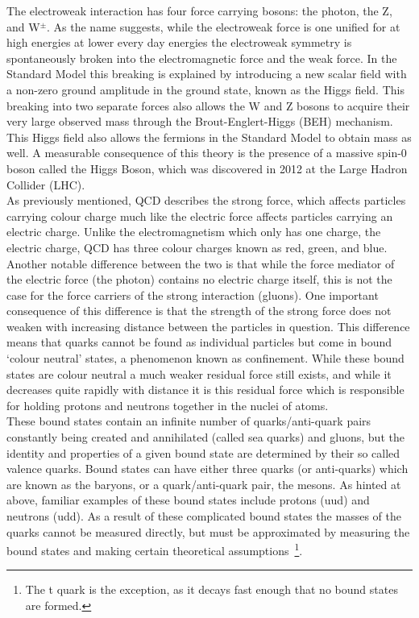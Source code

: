 The electroweak interaction has four force carrying bosons: the photon, the Z, and W$^{\pm}$.  
As the name suggests, while the electroweak force is one unified for at high energies at lower every day energies the electroweak symmetry is spontaneously broken into the electromagnetic force and the weak force.  
In the Standard Model this breaking is explained by introducing a new scalar field with a non-zero ground amplitude in the ground state, known as the Higgs field.  
This breaking into two separate forces also allows the W and Z bosons to acquire their very large observed mass through the Brout-Englert-Higgs (BEH) mechanism.  
This Higgs field also allows the fermions in the Standard Model to obtain mass as well.  
A measurable consequence of this theory is the presence of a massive spin-0 boson called the Higgs Boson, which was discovered in 2012 at the Large Hadron Collider (LHC).  \\

As previously mentioned, QCD describes the strong force, which affects particles carrying colour charge much like the electric force affects particles carrying an electric charge.  
Unlike the electromagnetism which only has one charge, the electric charge, QCD has three colour charges known as red, green, and blue.  
Another notable difference between the two is that while the force mediator of the electric force (the photon) contains no electric charge itself, this is not the case for the force carriers of the strong interaction (gluons).  
One important consequence of this difference is that the strength of the strong force does not weaken with increasing distance between the particles in question.  
This difference means that quarks cannot be found as individual particles but come in bound `colour neutral' states, a phenomenon known as confinement.  
While these bound states are colour neutral a much weaker residual force still exists, and while it decreases quite rapidly with distance it is this residual force which is responsible for holding protons and neutrons together in the nuclei of atoms.  \\

These bound states contain an infinite number of quarks/anti-quark pairs constantly being created and annihilated (called sea quarks) and gluons, but the identity and properties of a given bound state are determined by their so called valence quarks.  
Bound states can have either three quarks (or anti-quarks) which are known as the baryons, or a quark/anti-quark pair, the mesons.  
As hinted at above, familiar examples of these bound states include protons (uud) and neutrons (udd).  
As a result of these complicated bound states the masses of the quarks cannot be measured directly, but must be approximated by measuring the bound states and making certain theoretical assumptions~\footnote{The t quark is the exception, as it decays fast enough that no bound states are formed.}.
 

